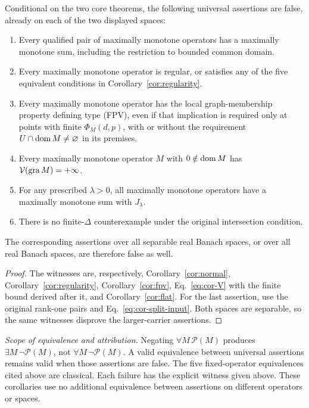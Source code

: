 \begin{corollary}\label{cor:universal}
Conditional on the two core theorems, the following universal assertions
are false, already on each of the two displayed spaces:
\begin{enumerate}
\item Every qualified pair of maximally monotone operators has a maximally
monotone sum, including the restriction to bounded common domain.
\item Every maximally monotone operator is regular, or satisfies any of
the five equivalent conditions in Corollary~\ref{cor:regularity}.
\item Every maximally monotone operator has the local graph-membership
property defining type (FPV), even if that implication is required only
at points with finite $\Phi_M(d,p)$, with or without the requirement
$U\cap\operatorname{dom} M\ne\varnothing$ in its premises.
\item Every maximally monotone operator $M$ with $0\notin\operatorname{dom} M$ has
$\mathcal V(\operatorname{gra} M)=+\infty$.
\item For any prescribed $\lambda>0$, all maximally monotone operators
have a maximally monotone sum with $J_\lambda$.
\item There is no finite-$\Delta$ counterexample under the original
intersection condition.
\end{enumerate}
The corresponding assertions over all separable real Banach spaces,
or over all real Banach spaces, are therefore false as well.
\end{corollary}
\begin{proof}
The witnesses are, respectively, Corollary~\ref{cor:normal},
Corollary~\ref{cor:regularity}, Corollary~\ref{cor:fpv},
Eq.~\eqref{eq:cor-V} with the finite bound derived after it, and
Corollary~\ref{cor:flat}. For the last assertion, use the original
rank-one pairs and Eq.~\eqref{eq:cor-split-input}. Both spaces are
separable, so the same witnesses disprove the larger-carrier assertions.
\end{proof}

\noindent\textit{Scope of equivalence and attribution.}
Negating $\forall M\,\mathcal P(M)$ produces $\exists M\,\neg\mathcal P(M)$,
not $\forall M\,\neg\mathcal P(M)$. A valid equivalence between universal
assertions remains valid when those assertions are false. The five
fixed-operator equivalences cited above are classical. Each failure has
the explicit witness given above. These corollaries use no additional
equivalence between assertions on different operators or spaces.

